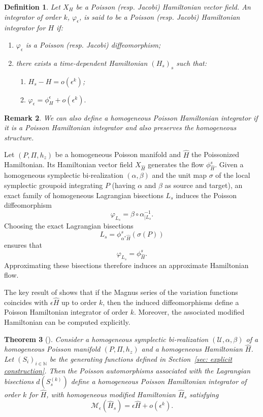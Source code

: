 \documentclass[12pt,english]{article}
\newtheorem{thm}{Theorem}[section]
\newtheorem{definition}[thm]{Definition}
\newtheorem{remark}[thm]{Remark}
\begin{document}
\begin{definition}
    Let $X_H$ be a Poisson (resp. Jacobi) Hamiltonian vector field. An integrator of order $k$, $\varphi_\epsilon$, is said to be a Poisson (resp. Jacobi) Hamiltonian integrator for $H$ if:
    \begin{enumerate}
        \item $\varphi_\epsilon$ is a Poisson (resp. Jacobi) diffeomorphism;
        \item there exists a time-dependent Hamiltonian $(H_s)_s$ such that:
        \begin{enumerate}
            \item $H_s-H = o(\epsilon^k)$;
            \item $\varphi_\epsilon = \phi^\epsilon_H + o(\epsilon^k).$
        \end{enumerate}
    \end{enumerate}
\end{definition}

\begin{remark}
    We can also define a homogeneous Poisson Hamiltonian integrator if it is a Poisson Hamiltonian integrator and also preserves the homogeneous structure.
\end{remark}

Let $(P, \Pi, h_z)$ be a homogeneous Poisson manifold and $\hat{H}$ the Poissonized Hamiltonian. Its Hamiltonian vector field $X_{\hat{H}}$ generates the flow $\phi_{\hat{H}}^s$. Given a homogeneous symplectic bi-realization $(\alpha, \beta)$ and the unit map $\sigma$ of the local symplectic groupoid integrating $P$ (having $\alpha$ and $\beta$ as source and target), an exact family of homogeneous Lagrangian bisections $L_s$ induces the Poisson diffeomorphism
\[
\varphi_{L_s} = \beta \circ \alpha^{-1}_{|L_s}.
\]
Choosing the exact Lagrangian bisections 
\[
L_s = \phi^s_{\alpha^* \hat{H}}(\sigma(P))
\] 
ensures that 
\[
\varphi_{L_s} = \phi^s_{\hat{H}}.
\]
Approximating these bisections therefore induces an approximate Hamiltonian flow.

The key result of \cite{COSSERAT2023} shows that if the Magnus series of the variation functions coincides with $\epsilon\hat H$ up to order $k$, then the induced diffeomorphisms define a Poisson Hamiltonian integrator of order $k$. Moreover, the associated modified Hamiltonian can be computed explicitly.

\begin{thm}[\cite{COSSERAT2023}]\label{thm: modified Ham}
Consider a homogeneous symplectic bi-realization $(\mathcal{U},\alpha,\beta)$ of a homogeneous Poisson manifold $(P,\Pi,h_z)$ and a homogeneous Hamiltonian $\hat H$. Let $(S_i)_{i\in\mathbb{N}}$ be the generating functions defined in Section~\ref{sec: explicit construction}. Then the Poisson automorphisms associated with the Lagrangian bisections $d(S_s^{(k)})$ define a homogeneous Poisson Hamiltonian integrator of order $k$ for $\hat H$, with homogeneous modified Hamiltonian $\hat{H}_s$ satisfying
\[
\mathcal{M}_\epsilon(\hat{H}_s)=\epsilon\hat H + o(\epsilon^k).
\]
\end{thm}
\end{document}
